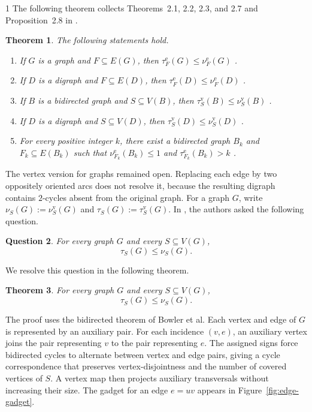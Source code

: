 \documentclass[a4paper,11pt]{article}
\theoremstyle{plain}
\newtheorem{theorem}{Theorem}[section]
\newtheorem{question}[theorem]{Question}
\theoremstyle{definition}
\theoremstyle{remark}
\begin{document}
\begin{spacing}{1}
The following theorem collects Theorems~2.1, 2.2, 2.3, and 2.7 and Proposition~2.8 in \cite{BowlerEtAl2026}.
\begin{theorem}\label{thm:bowler-results}
The following statements hold.
\begin{enumerate}[label=\textnormal{(\roman*)},leftmargin=2.4em,itemsep=1pt,
                  topsep=3pt]
\item If $G$ is a graph and $F\subseteq E(G)$, then
      $\tau^{\mathrm e}_F(G)\leq\nu^{\mathrm e}_F(G)$
      \cite[Theorem~2.1]{BowlerEtAl2026}.
\item If $D$ is a digraph and $F\subseteq E(D)$, then
      $\tau^{\mathrm e}_F(D)\leq\nu^{\mathrm e}_F(D)$
      \cite[Theorem~2.2]{BowlerEtAl2026}.
\item If $B$ is a bidirected graph and $S\subseteq V(B)$, then
      $\tau^{\mathrm v}_S(B)\leq\nu^{\mathrm v}_S(B)$
      \cite[Theorem~2.3]{BowlerEtAl2026}.
\item If $D$ is a digraph and $S\subseteq V(D)$, then
      $\tau^{\mathrm v}_S(D)\leq\nu^{\mathrm v}_S(D)$
      \cite[Theorem~2.7]{BowlerEtAl2026}.
\item For every positive integer $k$, there exist a bidirected graph
      $B_k$ and $F_k\subseteq E(B_k)$ such that
      $\nu^{\mathrm e}_{F_k}(B_k)\leq 1$ and
      $\tau^{\mathrm e}_{F_k}(B_k)>k$
      \cite[Proposition~2.8]{BowlerEtAl2026}.
\end{enumerate}
\end{theorem}

The vertex version for graphs remained open.  Replacing each edge by two
oppositely oriented arcs does not resolve it, because the resulting digraph
contains $2$-cycles absent from the original graph.  For a graph $G$, write
$\nu_S(G):=\nu^{\mathrm v}_S(G)$ and $\tau_S(G):=\tau^{\mathrm v}_S(G)$. In \cite{BowlerEtAl2026}, the authors asked the following question.

\begin{question}\label{conj:bowler}
For every graph $G$ and every $S\subseteq V(G)$,
\[
  \tau_S(G)\leq \nu_S(G).
\]
\end{question}

We resolve this question in the following theorem.

\begin{theorem}\label{thm:main}
For every graph $G$ and every $S\subseteq V(G)$,
\[
  \tau_S(G)\leq \nu_S(G).
\]
\end{theorem}

The proof uses the bidirected theorem of Bowler et al.  Each vertex and edge
of $G$ is represented by an auxiliary pair.  For each incidence $(v,e)$, an
auxiliary vertex joins the pair representing $v$ to the pair representing
$e$.  The assigned signs force bidirected cycles to alternate
between vertex and edge pairs, giving a cycle correspondence that preserves
vertex-disjointness and the number of covered vertices of $S$.  A vertex map
then projects auxiliary transversals without increasing their size.  The
gadget for an edge $e=uv$ appears in Figure~\ref{fig:edge-gadget}.


\end{spacing}
\end{document}
